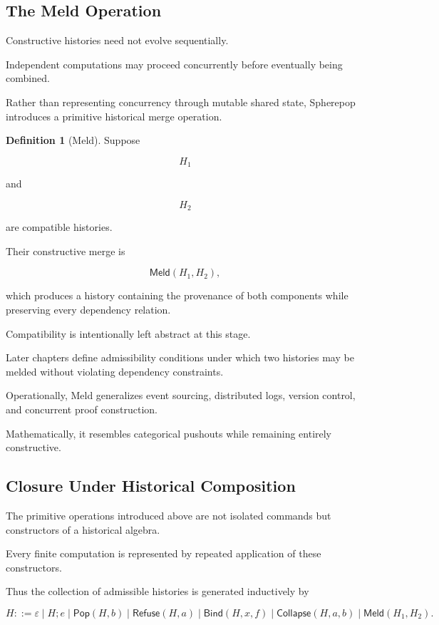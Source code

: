 \documentclass[12pt,oneside]{article}
\theoremstyle{definition}
\newtheorem{definition}[theorem]{Definition}
\theoremstyle{remark}
\newcommand{\Pop}{\mathsf{Pop}}
\newcommand{\Refuse}{\mathsf{Refuse}}
\newcommand{\Bind}{\mathsf{Bind}}
\newcommand{\Collapse}{\mathsf{Collapse}}
\newcommand{\Meld}{\mathsf{Meld}}
\begin{document}
\subsection{The Meld Operation}

Constructive histories need not evolve sequentially.

Independent computations may proceed concurrently before eventually being
combined.

Rather than representing concurrency through mutable shared state, Spherepop
introduces a primitive historical merge operation.

\begin{definition}[Meld]

Suppose

\[
H_1
\]

and

\[
H_2
\]

are compatible histories.

Their constructive merge is

\[
\Meld(H_1,H_2),
\]

which produces a history containing the provenance of both components while
preserving every dependency relation.

\end{definition}

Compatibility is intentionally left abstract at this stage.

Later chapters define admissibility conditions under which two histories may be
melded without violating dependency constraints.

Operationally, Meld generalizes event sourcing, distributed logs, version
control, and concurrent proof construction.

Mathematically, it resembles categorical pushouts while remaining entirely
constructive.

\subsection{Closure Under Historical Composition}

The primitive operations introduced above are not isolated commands but
constructors of a historical algebra.

Every finite computation is represented by repeated application of these
constructors.

Thus the collection of admissible histories is generated inductively by

\[
H
::=
\varepsilon
\mid
H;e
\mid
\Pop(H,b)
\mid
\Refuse(H,a)
\mid
\Bind(H,x,f)
\mid
\Collapse(H,a,b)
\mid
\Meld(H_1,H_2).
\]
\end{document}
